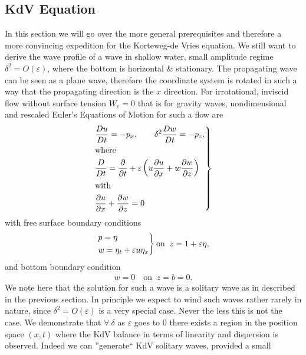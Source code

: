\subsection{KdV Equation\label{sec:kdv}}
In this section we will go over the more general prerequisites and therefore
a more convincing expedition for the Korteweg-de Vries equation. We still
want to derive the wave profile of a wave in shallow water, small amplitude
regime $\delta^2 = O(\varepsilon)$, where the bottom is horizontal \&
stationary. The propagating wave can be seen as a plane wave, therefore the
coordinate system is rotated in such a way that the propagating direction is
the $x$ direction. For irrotational, inviscid flow without surface tension
$W_e=0$ that is for gravity waves, nondimensional and rescaled Euler's
Equations of Motion for such a flow are
\begin{align}
    \begin{drcases}
        \frac{Du}{Dt}=-p_x,\quad \quad \delta^2
        \frac{Dw}{Dt} = -p_z,\\
    \text{where}\\
    \frac{D}{Dt} = \frac{\partial }{\partial t}  + \varepsilon
    \left(
    u\frac{\partial u}{\partial x}
    +w\frac{\partial w}{\partial z}\right)
\\
    \text{with}\\
    \frac{\partial u}{\partial x} +\frac{\partial w}{\partial z}  = 0
    \end{drcases}
\end{align}
with free surface boundary conditions
\begin{align}
    \begin{drcases}
        p=\eta\\
        w=\eta_t+\varepsilon u \eta_x
    \end{drcases}
    \text{on}\;\; z= 1+\varepsilon\eta,
\end{align}
and bottom boundary condition
\begin{align}
    w = 0 \quad \text{on}\;\; z=b =0.
\end{align}
We note here that the solution for such a wave is a solitary wave as in
described in the previous section. In principle we expect to wind such waves
rather rarely in nature, since $\delta^2 = O(\varepsilon)$ is a very special
case. Never the less this is not the case. We demonstrate that $\forall\
\delta$ as $\varepsilon$ goes to $0$ there exists a region in the position
space $(x, t)$ where the KdV balance in terms of linearity and dispersion
is observed. Indeed we can ''generate`` KdV solitary waves, provided a small
